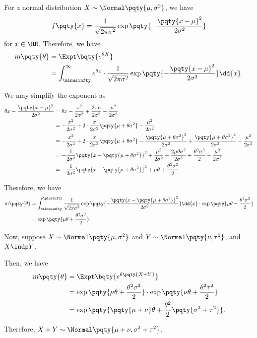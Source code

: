 \begin{example}
    \label{ex:mgf-normal}%
    For a normal distribution \(X \sim \Normal\pqty{\mu, \sigma^2}\), we have
    \[
        f\pqty{x} = \frac{1}{\sqrt{2 \pi \sigma^2}} \exp\pqty{- \frac{\pqty{x - \mu}^2}{2 \sigma^2}}
    \]
    for \(x \in \RR\). Therefore, we have
    \begin{align*}
        m\pqty{\theta} &= \Expt\bqty{e^{\theta X}} \\
        &= \int_{\minusinfty}^{\infty} e^{\theta x} \cdot \frac{1}{\sqrt{2 \pi \sigma^2}} \exp\pqty{- \frac{\pqty{x - \mu}^2}{2 \sigma^2}} \dd{x}.
    \end{align*}

    We may simplify the exponent as
    \begin{align*}
        \theta x - \frac{\pqty{x - \mu}^2}{2 \sigma^2} &= \theta x - \frac{x^2}{2 \sigma^2} + \frac{2 x \mu}{2 \sigma^2} - \frac{\mu^2}{2 \sigma^2} \\
        &= - \frac{x^2}{2 \sigma^2} + 2 \cdot \frac{x}{2 \sigma^2} \pqty{\mu + \theta \sigma^2} - \frac{\mu^2}{2 \sigma^2} \\
        &= - \frac{x^2}{2 \sigma^2} + 2 \cdot \frac{x}{2 \sigma^2} \pqty{\mu + \theta \sigma^2} - \frac{\pqty{\mu + \theta \sigma^2}^2}{2 \sigma^2} + \frac{\pqty{\mu + \theta \sigma^2}^2}{2 \sigma^2} - \frac{\mu^2}{2 \sigma^2} \\
        &= - \frac{1}{2 \sigma^2} \pqty{x - \pqty{\mu + \theta \sigma^2}}^2 + \frac{\mu^2}{2 \sigma^2} + \frac{2 \mu \theta \sigma^2}{2 \sigma^2} + \frac{\theta^2 \sigma^2}{2} - \frac{\mu^2}{2 \sigma^2} \\
        &= - \frac{1}{2 \sigma^2} \pqty{x - \pqty{\mu + \theta \sigma^2}}^2 + \mu \theta + \frac{\theta^2 \sigma^2}{2}.
    \end{align*}

    Therefore, we have
    \begin{align*}
        m\pqty{\theta} &= \int_{\minusinfty}^{\plusinfty} \frac{1}{\sqrt{2 \pi \sigma^2}} \exp\pqty{- \frac{\pqty{x - \pqty{\mu + \theta \sigma^2}}^2}{2 \sigma^2}} \dd{x}  \cdot \exp \pqty{\mu \theta + \frac{\theta^2 \sigma^2}{2}} \\
        &= \exp\pqty{\mu \theta + \frac{\theta^2 \sigma^2}{2}}.
    \end{align*}

    Now, suppose \(X \sim \Normal\pqty{\mu, \sigma^2}\) and \(Y \sim \Normal\pqty{\nu, \tau^2}\), and \(X \indp Y\).

    Then, we have
    \begin{align*}
        m\pqty{\theta} &= \Expt\bqty{e^{\theta \pqty{X + Y}}} \\
        &= \exp\pqty{\mu \theta + \frac{\theta^2 \sigma^2}{2}} \cdot \exp\pqty{\nu \theta + \frac{\theta^2 \tau^2}{2}} \\
        &= \exp\pqty{\pqty{\mu + \nu} \theta + \frac{\theta^2}{2} \pqty{\sigma^2 + \tau^2}}.
    \end{align*}

    Therefore, \(X + Y \sim \Normal\pqty{\mu + \nu, \sigma^2 + \tau^2}\).
\end{example}

